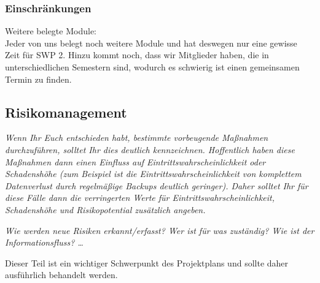 \documentclass[fontsize=12pt,paper=a4,twoside]{scrartcl}
\begin{document}
\subsubsection{Einschränkungen}
Weitere belegte Module: \\
Jeder von uns belegt noch weitere Module und hat deswegen nur eine gewisse Zeit für SWP 2. Hinzu kommt noch, dass wir Mitglieder haben, die in unterschiedlichen Semestern sind, wodurch es schwierig ist einen gemeinsamen Termin zu finden. \\

\subsection{Risikomanagement}\label{riskmanagement}

{\em Wenn Ihr Euch entschieden habt, bestimmte vorbeugende Maßnahmen 
     durchzuführen, solltet Ihr dies deutlich kennzeichnen. Hoffentlich
     haben diese Maßnahmen dann einen Einfluss auf Eintrittswahrscheinlichkeit oder Schadenshöhe (zum Beispiel
     ist die Eintrittswahrscheinlichkeit von komplettem Datenverlust durch regelmäßige Backups deutlich 
     geringer). Daher solltet Ihr für diese Fälle dann die verringerten Werte für Eintrittswahrscheinlichkeit, 
     Schadenshöhe und Risikopotential zusätzlich angeben. }

{\em Wie werden neue Risiken erkannt/erfasst? Wer ist für was
  zuständig? Wie ist der Informationsfluss? \ldots 

Dieser Teil ist ein
  wichtiger Schwerpunkt des Projektplans und sollte daher ausführlich
  behandelt werden.}
\end{document}
